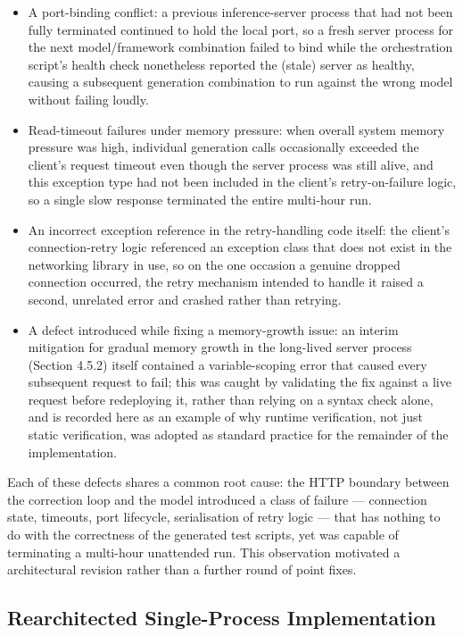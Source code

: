\begin{itemize}
\item
  A port-binding conflict: a previous inference-server process that had
  not been fully terminated continued to hold the local port, so a fresh
  server process for the next model/framework combination failed to bind
  while the orchestration script's health check nonetheless reported the
  (stale) server as healthy, causing a subsequent generation combination
  to run against the wrong model without failing loudly.
\item
  Read-timeout failures under memory pressure: when overall system
  memory pressure was high, individual generation calls occasionally
  exceeded the client's request timeout even though the server process
  was still alive, and this exception type had not been included in the
  client's retry-on-failure logic, so a single slow response terminated
  the entire multi-hour run.
\item
  An incorrect exception reference in the retry-handling code itself:
  the client's connection-retry logic referenced an exception class that
  does not exist in the networking library in use, so on the one
  occasion a genuine dropped connection occurred, the retry mechanism
  intended to handle it raised a second, unrelated error and crashed
  rather than retrying.
\item
  A defect introduced while fixing a memory-growth issue: an interim
  mitigation for gradual memory growth in the long-lived server process
  (Section 4.5.2) itself contained a variable-scoping error that caused
  every subsequent request to fail; this was caught by validating the
  fix against a live request before redeploying it, rather than relying
  on a syntax check alone, and is recorded here as an example of why
  runtime verification, not just static verification, was adopted as
  standard practice for the remainder of the implementation.
\end{itemize}

Each of these defects shares a common root cause: the HTTP boundary
between the correction loop and the model introduced a class of failure
--- connection state, timeouts, port lifecycle, serialisation of retry
logic --- that has nothing to do with the correctness of the generated
test scripts, yet was capable of terminating a multi-hour unattended
run. This observation motivated a architectural revision rather than a
further round of point fixes.

\subsection{Rearchitected Single-Process Implementation}

